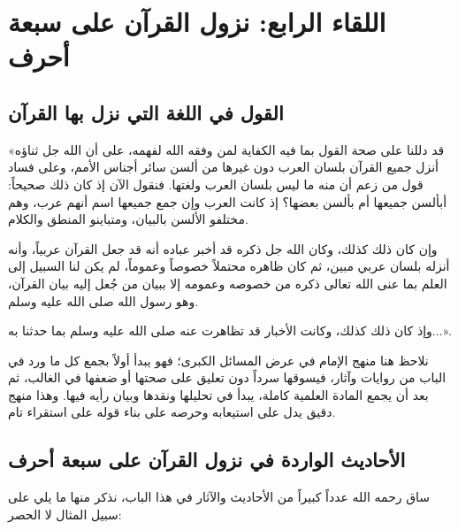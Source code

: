 \chapter{اللقاء الرابع: نزول القرآن على سبعة أحرف}

\section{القول في اللغة التي نزل بها القرآن}
«قد دللنا على صحة القول بما فيه الكفاية لمن وفقه الله لفهمه، على أن الله جل ثناؤه أنزل جميع القرآن بلسان العرب دون غيرها من ألسن سائر أجناس الأمم، وعلى فساد قول من زعم أن منه ما ليس بلسان العرب ولغتها. فنقول الآن إذ كان ذلك صحيحاً: أبألسن جميعها أم بألسن بعضها؟ إذ كانت العرب وإن جمع جميعها اسم أنهم عرب، وهم مختلفو الألسن بالبيان، ومتباينو المنطق والكلام.

وإن كان ذلك كذلك، وكان الله جل ذكره قد أخبر عباده أنه قد جعل القرآن عربياً، وأنه أنزله بلسان عربي مبين، ثم كان ظاهره محتملاً خصوصاً وعموماً، لم يكن لنا السبيل إلى العلم بما عنى الله تعالى ذكره من خصوصه وعمومه إلا ببيان من جُعل إليه بيان القرآن، وهو رسول الله صلى الله عليه وسلم.

وإذ كان ذلك كذلك، وكانت الأخبار قد تظاهرت عنه صلى الله عليه وسلم بما حدثنا به...».

\begin{fawaid}
نلاحظ هنا منهج الإمام  في عرض المسائل الكبرى؛ فهو يبدأ أولاً بجمع كل ما ورد في الباب من روايات وآثار، فيسوقها سرداً دون تعليق على صحتها أو ضعفها في الغالب، ثم بعد أن يجمع المادة العلمية كاملة، يبدأ في تحليلها ونقدها وبيان رأيه فيها. وهذا منهج دقيق يدل على استيعابه وحرصه على بناء قوله على استقراء تام.
\end{fawaid}

\section{الأحاديث الواردة في نزول القرآن على سبعة أحرف}
ساق  رحمه الله عدداً كبيراً من الأحاديث والآثار في هذا الباب، نذكر منها ما يلي على سبيل المثال لا الحصر:

